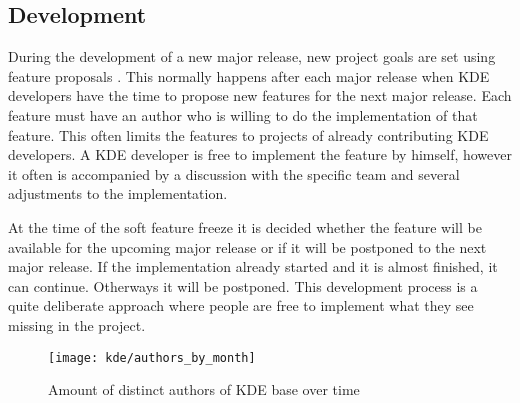
\subsection{Development} %
\label{sub:Development}

During the development of a new major release, new project goals are set using
feature proposals \cite{KDEDevelopmentModel,KDEFAQ}. This normally happens
after each major release when KDE developers have the time to propose new
features for the next major release. Each feature must have an author who is
willing to do the implementation of that feature. This often limits the
features to projects of already contributing KDE developers. A KDE developer is
free to implement the feature by himself, however it often is accompanied by a
discussion with the specific team and several adjustments to the
implementation.

At the time of the soft feature freeze it is decided whether the feature will
be available for the upcoming major release or if it will be postponed to the
next major release. If the implementation already started and it is almost
finished, it can continue. Otherways it will be postponed. This development
process is a quite deliberate approach where people are free to implement what
they see missing in the project.

\begin{figure}[htbp]
  \centering
  \texttt{[image: kde/authors\_by\_month]}
  \caption{Amount of distinct authors of KDE base over time}
\end{figure}


